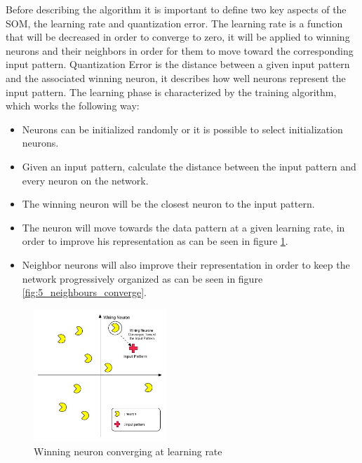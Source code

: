 Before describing the algorithm it is important to define two key aspects of the SOM, the learning rate and quantization error. The learning rate is a function that will be decreased in order to converge to zero, it will be applied to winning neurons and their neighbors in order for them to move toward the corresponding input pattern. Quantization Error is the distance between a given input pattern and the associated winning neuron, it describes how well neurons represent the input pattern.
The learning phase is characterized by the training algorithm, which works the following way:
\begin{itemize}
  \item Neurons can be initialized randomly or it is possible to select initialization neurons.
  \item Given an input pattern, calculate the distance between the input pattern and every neuron on the network.
  \item The winning neuron will be the closest neuron to the input pattern.
  \item The neuron will move towards the data pattern at a given learning rate, in order to improve his representation as can be seen in figure \ref{fig:4_wining_neuron_converge}.
  \item Neighbor neurons will also improve their representation in order to keep the network progressively organized as can be seen in figure \ref{fig:5_neighbours_converge}.
\end{itemize}

\begin{figure}
  \begin{center}
    \includegraphics[width=5cm]{images/4_wining_neuron_converge.jpg}
  \end{center}
  \caption{ Winning neuron converging at learning rate }
  \label{fig:4_wining_neuron_converge}
\end{figure}


